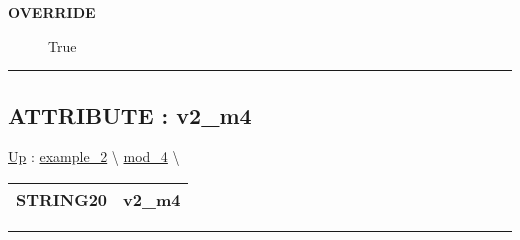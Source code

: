 \par

\par
\begin{description}
\item [\textbf{OVERRIDE}] True
\end{description}

\rule{\linewidth}{0.5pt}
\subsection*{ATTRIBUTE : v2\_m4}
\hypertarget{ecldoc:intest.inintest.example_2.mod_4.v2_m4}{}
\hyperlink{ecldoc:intest.inintest.example_2.mod_4}{Up} :
\hspace{0pt} \hyperlink{ecldoc:intest.inintest.example_2}{example_2} \textbackslash 
\hspace{0pt} \hyperlink{ecldoc:intest.inintest.example_2.mod_4}{mod_4} \textbackslash 

{\renewcommand{\arraystretch}{1.5}
\begin{tabularx}{\textwidth}{|>{\raggedright\arraybackslash}l|X|}
\hline
\hspace{0pt}STRING20 & v2\_m4 \\
\hline
\end{tabularx}
}

\par


\rule{\linewidth}{0.5pt}




